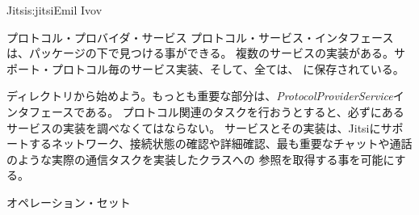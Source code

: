 \begin{aosachapter}{Jitsi}{s:jitsi}{Emil Ivov}
\begin{aosasect1}{プロトコル・プロバイダ・サービス}
プロトコル・サービス・インタフェースは、パッケージの下で見つける事ができる。
複数のサービスの実装がある。サポート・プロトコル毎のサービス実装、そして、全ては、
に保存されている。

ディレクトリから始めよう。もっとも重要な部分は、\emph{ProtocolProviderService}インタフェースである。
プロトコル関連のタスクを行おうとすると、必ずにあるサービスの実装を調べなくてはならない。
サービスとその実装は、Jitsiにサポートするネットワーク、接続状態の確認や詳細確認、最も重要なチャットや通話のような実際の通信タスクを実装したクラスへの
参照を取得する事を可能にする。

\begin{aosasect2}{オペレーション・セット}


\end{aosasect2}
\end{aosasect1}
\end{aosachapter}
